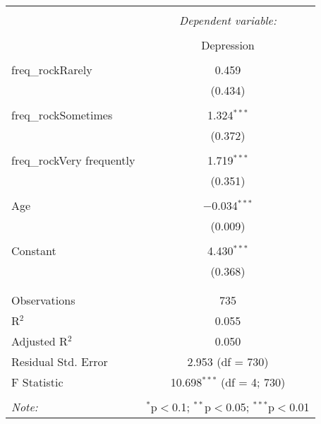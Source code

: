 \documentclass{article}
\begin{document}
\begin{table}[!htbp] \centering 
  \caption{} 
  \label{} 
\begin{tabular}{@{\extracolsep{5pt}}lc} 
\\[-1.8ex]\hline 
\hline \\[-1.8ex] 
 & \multicolumn{1}{c}{\textit{Dependent variable:}} \\ 
\cline{2-2} 
\\[-1.8ex] & Depression \\ 
\hline \\[-1.8ex] 
 freq\_rockRarely & 0.459 \\ 
  & (0.434) \\ 
  & \\ 
 freq\_rockSometimes & 1.324$^{***}$ \\ 
  & (0.372) \\ 
  & \\ 
 freq\_rockVery frequently & 1.719$^{***}$ \\ 
  & (0.351) \\ 
  & \\ 
 Age & $-$0.034$^{***}$ \\ 
  & (0.009) \\ 
  & \\ 
 Constant & 4.430$^{***}$ \\ 
  & (0.368) \\ 
  & \\ 
\hline \\[-1.8ex] 
Observations & 735 \\ 
R$^{2}$ & 0.055 \\ 
Adjusted R$^{2}$ & 0.050 \\ 
Residual Std. Error & 2.953 (df = 730) \\ 
F Statistic & 10.698$^{***}$ (df = 4; 730) \\ 
\hline 
\hline \\[-1.8ex] 
\textit{Note:}  & \multicolumn{1}{r}{$^{*}$p$<$0.1; $^{**}$p$<$0.05; $^{***}$p$<$0.01} \\ 
\end{tabular} 
\end{table}
\end{document}
